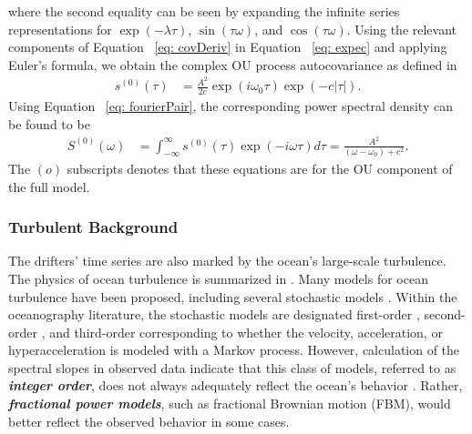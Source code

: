 \documentclass{stat572Style}
\begin{document}
where the second equality can be seen by expanding the infinite series representations for $\exp(-\lambda \tau)$, $\sin(\tau \omega)$, and $\cos( \tau \omega)$. 
Using the relevant components of Equation ~\ref{eq: covDeriv} in Equation ~\ref{eq: expec} and applying Euler's formula, we obtain the complex OU process autocovariance as defined in \citet{Sykulski2016}
\begin{align}
\label{eq: ouAC}
s^{(0)}(\tau) & = \frac{A^{2}}{2c} \exp(i \omega_{0}\tau) \exp(-c|\tau|).
\end{align}
 Using Equation ~\ref{eq: fourierPair}, the corresponding power spectral density can be found to be\begin{align}
\label{eq:ouPSD}
S^{(0)}(\omega) &= \int_{-\infty}^{\infty} s^{(0)}(\tau) \exp (-i \omega \tau) d \tau = \frac{A^{2}}{(\omega - \omega_{0}) + c^{2}}. 
\end{align}
The $(o)$ subscripts denotes that these equations are for the OU component of the full model. 


\subsubsection{Turbulent Background}
The drifters' time series are also marked by the ocean's large-scale turbulence. 
The physics of ocean turbulence is summarized in \citet{Rhines1979}. 
Many models for ocean turbulence have been proposed, including several stochastic models \citep{Lacasce2008}. 
Within the oceanography literature, the stochastic models are designated  first-order \citep{Griffa1995, Falco2000}, second-order \citep{Sawford1991}, and third-order corresponding to  whether the velocity, acceleration, or hyperacceleration is modeled with a Markov process. 
However, calculation of the spectral slopes in observed data indicate that this class of models, referred to as \textbf{\it{integer order}},  does not always adequately reflect the ocean's behavior \citep{Rupolo1996, Sanderson1991}. Rather, \textbf{\it{fractional power models}}, such as fractional Brownian motion (FBM), would better reflect the observed behavior in some cases. 
\end{document}
